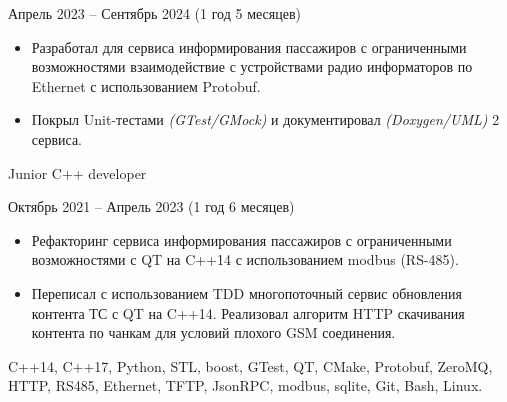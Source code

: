{    \cvexperiencePeriod
        {Апрель 2023 -- Сентябрь 2024 (1 год 5 месяцев)}

    \smallskip
    \begin{itemize}

        \item
            Разработал для сервиса информирования пассажиров с ограниченными возможностями
            взаимодействие с устройствами радио информаторов по Ethernet с использованием Protobuf.

        \item
            Покрыл Unit-тестами \textit{(GTest/GMock)} и документировал \textit{(Doxygen/UML)}
            2 сервиса.

    \end{itemize}


    \cvexperiencePosition
        {Junior C++ developer}

    \cvexperiencePeriod
        {Октябрь 2021 -- Апрель 2023 (1 год 6 месяцев)}

    \smallskip
    \begin{itemize}

        \item
            Рефакторинг сервиса информирования пассажиров с ограниченными возможностями
            с QT на C++14 с использованием modbus (RS-485).

        \item
            Переписал с использованием TDD многопоточный сервис обновления контента ТС с QT на
            C++14. Реализовал алгоритм HTTP скачивания контента по чанкам для условий плохого GSM
            соединения.

    \end{itemize}


    \funcExperienceTechnology
    {
        C++14, C++17, Python,                                           %
        STL, boost, GTest, QT,                                          %
        CMake,                                                          %
        Protobuf, ZeroMQ, HTTP, RS485, Ethernet, TFTP, JsonRPC, modbus, %
        sqlite,
        Git,                                                            %
        Bash, Linux.                                                    %
    }
}


